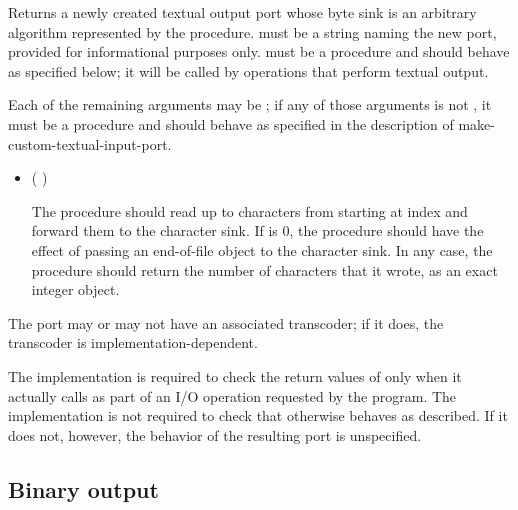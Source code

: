 \begin{entry}{%
}

Returns a newly created textual output port whose byte sink is
an arbitrary algorithm represented by the  procedure.
 must be a string naming the new port,
provided for informational purposes only.
 must be a procedure and should behave as specified
below; it will be called by operations that perform textual output.

Each of the remaining arguments may be \schfalse{}; if any of
those arguments is not \schfalse{}, it must be a procedure and
should behave as specified in the description of
{\cf make-custom-textual-input-port}.
   
\begin{itemize}
\item {\cf (   )}
       
  The  procedure should read up to  characters
  from  starting at index  and forward
  them to the character sink.
  If  is 0, the  procedure should
  have the effect of passing an end-of-file object to the character sink.
  In any case, the  procedure should return the number of
  characters that it wrote, as an exact integer object.
\end{itemize}

The port may or may not have an associated transcoder; if it does, the
transcoder is implementation-dependent.

\implresp The implementation is required to check the return
values of  only when it actually calls  as part of
an I/O operation requested by the program.  The implementation is not
required to check that  otherwise behaves as described.
If it does not, however, the behavior of the resulting port is
unspecified.
\end{entry}

\subsection{Binary output}

